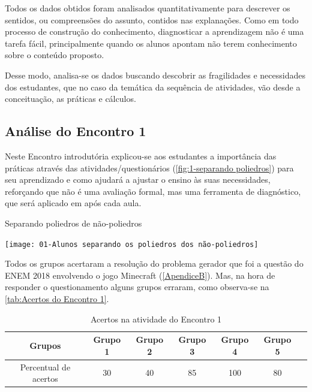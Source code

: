Todos os dados obtidos foram analisados quantitativamente para descrever os sentidos, ou compreensões do assunto, contidos nas explanações. Como em todo processo de construção do conhecimento, diagnosticar a aprendizagem não é uma tarefa fácil, principalmente quando os alunos apontam não terem conhecimento sobre o conteúdo proposto.

Desse modo, analisa-se os dados buscando descobrir as fragilidades e necessidades dos estudantes, que no caso da temática da sequência de atividades, vão desde a conceituação, as práticas e cálculos.

\subsection{Análise do Encontro 1}

Neste Encontro introdutória explicou-se aos estudantes a importância das práticas através das atividades/questionários (\autoref{fig:1-separando poliedros}) para seu aprendizado e como ajudará a ajustar o ensino às suas necessidades, reforçando que não é uma avaliação formal, mas uma ferramenta de diagnóstico, que será aplicado em após cada aula.

\begin{CenteredFigure}
    \caption{Separando poliedros de não-poliedros} \label{fig:1-separando poliedros}
    \texttt{[image: 01-Alunos separando os poliedros dos não-poliedros]}
    \legend{\autoria}
\end{CenteredFigure}

Todos os grupos acertaram a resolução do problema gerador que foi a questão do ENEM 2018 envolvendo o jogo Minecraft (\autoref{ApendiceB}). Mas, na hora de responder o questionamento alguns grupos erraram, como observa-se na \autoref{tab:Acertos do Encontro 1}.

\begin{table}[htbp] \centering
    \caption{Acertos na atividade do Encontro 1} \label{tab:Acertos do Encontro 1}
    \begin{tabular}{|c|c|c|c|c|c|c|}
        \hline
        \textbf{Grupos}       & \textbf{Grupo 1} & \textbf{Grupo 2} & \textbf{Grupo 3} & \textbf{Grupo 4} & \textbf{Grupo 5} \\
        \hline
        Percentual de acertos & 30               & 40               & 85               & 100              & 80               \\
        \hline
    \end{tabular}
    \legend{\legendaTabela}
\end{table}

